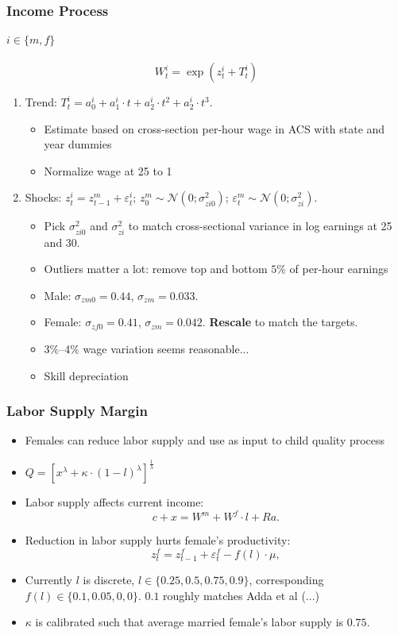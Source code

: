 \documentclass{beamer}
\begin{document}
\begin{frame}
\frametitle{Income Process}
\framesubtitle{$i \in \{m,f\}$}
\[W^i_t = \exp(z^i_t + T^i_t)\]

\begin{enumerate}
\item Trend: $ T^i_t = a^i_0 + a^i_1\cdot t +  a^i_2\cdot t^2 + a^i_2\cdot t^3.$
\begin{itemize}
\item Estimate based on cross-section per-hour wage in ACS with state and year dummies
\item Normalize wage at 25 to 1
\end{itemize}
\item Shocks: $z^i_t = z^m_{t-1} + \varepsilon^i_t$; $z^m_0 \sim \mathcal{N}(0;\sigma^2_{zi0})$; $\varepsilon^m_t \sim \mathcal{N}(0;\sigma^2_{zi})$.
\begin{itemize}
\item Pick $\sigma^2_{zi0}$ and  $\sigma^2_{zi}$ to match cross-sectional variance in log earnings at 25 and 30.
\item Outliers matter a lot: remove top and bottom $5\%$ of per-hour earnings
\item Male: $\sigma_{zm0} = 0.44$, $\sigma_{zm} = 0.033$.
\item Female: $\sigma_{zf0} = 0.41$, $\sigma_{zm} = 0.042$. \textbf{Rescale} to match the targets.
\item 3\%--4\% wage variation seems reasonable...
\item Skill depreciation
\end{itemize}
\end{enumerate}
\end{frame}

\begin{frame}
\frametitle{Labor Supply Margin}
\begin{itemize}
\item Females can reduce labor supply and use as input to child quality process
\item $Q = \left[x^{\lambda} + \kappa\cdot (1-l)^{\lambda}\right]^{\frac1\lambda}$
\item Labor supply affects current income:
\[c + x  = W^m + W^f\cdot l + R a.\]
\item Reduction in labor supply hurts female's productivity:
\[z^f_t = z^f_{t-1} + \varepsilon^f_{t} - f(l)\cdot \mu,\]
\item Currently $l$ is discrete, $l \in \{0.25,0.5,0.75,0.9\}$, corresponding $f(l) \in \{0.1,0.05,0,0\}$. $0.1$ roughly matches Adda et al (...)
\item $\kappa$ is calibrated such that average married female's labor supply is $0.75$.
\end{itemize}
\end{frame}
\end{document}
